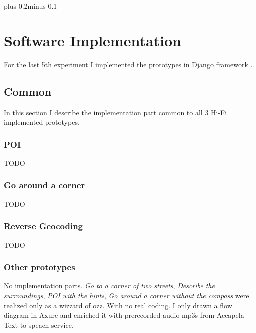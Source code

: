 \documentclass[11pt,oneside,a4paper]{book}
\begin{document}
	\mainbodystarts
	\normalfont
	\baselineskip plus 0.2\baselineskip minus 0.1\baselineskip
	
	
	
	
	
	
	

	\chapter{Software Implementation}
		For the last 5th experiment I implemented the prototypes in  Django framework \cite{django}.
		\section{Common}
			In this section I describe the implementation part common to all 3 Hi-Fi implemented prototypes.
		
		
		\subsection{POI}
			TODO		
		\subsection{Go around a corner}
			TODO
		\subsection{Reverse Geocoding}
			TODO
			
		\subsection{Other prototypes}
			No implementation parts.
			\emph{Go to a corner of two streets}, 
			\emph{Describe the surroundings},
			\emph{POI with the hints},
			\emph{Go around a corner without the compass}
			 were realized only as a wizzard of ozz. With no real coding. I only drawn a flow diagram in Axure and enriched it with prerecorded audio mp3s from Accapela Text to speach service.
\end{document}

